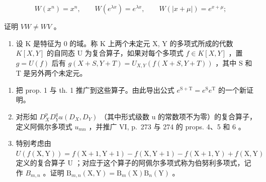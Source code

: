 \[
W (x ^ {n}) = x ^ {n}, \qquad W (e ^ {\lambda x}) = e ^ {\lambda x}, \qquad W (| x + \mu |) = e ^ {x + \mu};
\]

证明 \(VW \neq WV\) 。

\begin{enumerate}
\def\labelenumi{\arabic{enumi})}
\setcounter{enumi}{2}
\tightlist
\item
  设 K 是特征为 0 的域。称 K 上两个未定元 X, Y 的多项式所成的代数 \(K[X,Y]\) 的自同态 U 为复合算子，如果对每个多项式 \(f \in K[X,Y]\) ，置 \(g = U(f)\) 后有 \(g(X + S, Y + T) = U_{X,Y}(f(X + S, Y + T))\) ，其中 S 和 T 是另外两个未定元。
\end{enumerate}

\begin{enumerate}
\def\labelenumi{\alph{enumi})}
\item
  把 prop. 1 与 th. 1 推广到这些算子。由此导出公式 \(e^{\mathrm{S + T}} = e^{\mathrm{S}}e^{\mathrm{T}}\) 的一个新证明。
\item
  对形如 \(D_{X}^{p}D_{Y}^{q}u(D_{X},D_{Y})\) （其中形式级数 u 的常数项不为零）的复合算子，定义阿佩尔多项式 \(u_{mn}\) ，并推广 VI, p.~273 与 274 的 props. 4、5 和 6 。
\item
  特别考虑由 \(U(f(\mathrm{X},\mathrm{Y})) = f(\mathrm{X} + 1, \mathrm{Y} + 1) - f(\mathrm{X},\mathrm{Y} + 1) - f(\mathrm{X} + 1, \mathrm{Y}) + f(\mathrm{X},\mathrm{Y})\) 定义的复合算子 U ；对应于这个算子的阿佩尔多项式称为伯努利多项式，记作 \(B_{m,n}\) 。证明 \(\mathrm{B}_{m,n}(\mathrm{X},\mathrm{Y}) = \mathrm{B}_{m}(\mathrm{X})\mathrm{B}_{n}(\mathrm{Y})\) 。
\end{enumerate}

\setcounter{exercisegroup}{1}
